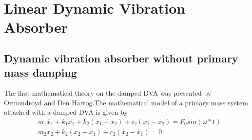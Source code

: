 \chapter{Linear Dynamic Vibration Absorber}
\section{Dynamic vibration absorber without primary mass damping}
The first mathematical theory on the damped DVA was presented by Ormondroyd and Den Hartog.The mathematical model of a primary mass system attached with a damped DVA is given by-\begin{align}
&m_1\ddot{x_1}+k_1x_1+k_2(x_1-x_2)+c_2(\dot{x_1}-\dot{x_2})=F_0sin(\omega *t) \\
&m_2\ddot{x_2}+k_2(x_2-x_1)+c_{2}(\dot{x_{2}}-\dot{x_{1}})=0
\end{align}

